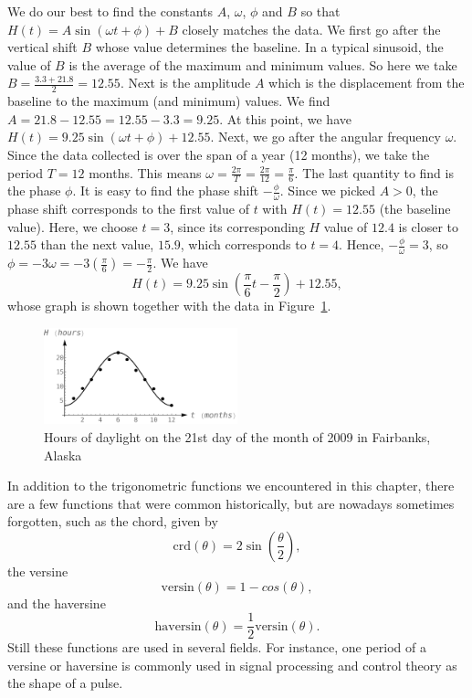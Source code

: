 \begin{example}
We do our best to find the constants $A$, $\omega$, $\phi$ and $B$ so that  $H(t) = A\sin(\omega t + \phi) + B$ closely matches the data.  We first go after the vertical shift $B$ whose value determines the baseline.  In a typical sinusoid, the value of $B$ is the average of the maximum and minimum values.  So here we take $B = \frac{3.3+21.8}{2} = 12.55$.  Next is the amplitude $A$ which is the displacement from the baseline to the maximum (and minimum) values.  We find $A = 21.8 - 12.55 = 12.55 - 3.3 = 9.25$.  At this point, we have $H(t) = 9.25\sin(\omega t + \phi) + 12.55$.  Next, we go after the angular frequency $\omega$.  Since the data collected is over the span of a year (12 months), we take the period $T = 12$ months.  This means $\omega = \frac{2\pi}{T} = \frac{2\pi}{12} = \frac{\pi}{6}$.  The last quantity to find is the phase $\phi$. It is easy to find the phase shift $-\frac{\phi}{\omega}$.  Since we picked $A > 0$, the phase shift corresponds to the first value of $t$ with $H(t) = 12.55$ (the baseline value).  Here, we choose $t = 3$, since its corresponding $H$ value of $12.4$ is closer to  $12.55$ than the next value, $15.9$, which corresponds to $t=4$.  Hence, $-\frac{\phi}{\omega} = 3$, so $\phi = -3 \omega = -3 \left(\frac{\pi}{6}\right) = -\frac{\pi}{2}$.  We have 
$$H(t) = 9.25 \sin\left(\frac{\pi}{6} t - \frac{\pi}{2}\right) + 12.55,$$
whose graph is shown together with the data in Figure~\ref{fig_trans_28}. 

\begin{figure}[H]
	\begin{center}
			\includegraphics[width=0.5\textwidth]{fig_trans_28}
	\caption{Hours of daylight on the 21st day of the month of 2009 in Fairbanks, Alaska}
	\label{fig_trans_28}
	\end{center}
\end{figure}


\end{example}


\begin{remark}
In addition to the trigonometric functions we encountered in this chapter, there are a few functions that were common historically, but are nowadays sometimes forgotten, such as the chord, given by 
$$
\text{crd}(\theta) = 2\sin\left(\frac{\theta}{2}\right),
$$
the versine 
$$\text{versin}(\theta) = 1 - cos(\theta),
$$
and  the haversine 
$$
\text{haversin}(\theta) = \dfrac{1}{2}\text{versin}(\theta).
$$
Still these functions are used in several fields. For instance, one period  of a versine or haversine is commonly used in signal processing and control theory as the shape of a pulse.
\end{remark}

